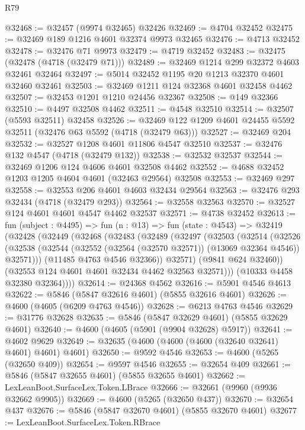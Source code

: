 \begin{lexlean}{R79}
\begin{coremodule}
@32468 := @32457 (@9974 @32465) @32426
@32469 := @4704 @32452
@32475 := @32469 @189 @1216 @4601 @32374 @9973 @32465
@32476 := @4713 @32452
@32478 := @32476 @71 @9973
@32479 := @4719 @32452
@32483 := @32475 (@32478 (@4718 (@32479 @71)))
@32489 := @32469 @1214 @299 @32372 @4603 @32461 @32464
@32497 := @5014 @32452 @1195 @20 @1213 @32370 @4601 @32460 @32461
@32503 := @32469 @1211 @124 @32368 @4601 @32458 @4462
@32507 := @32453 @1201 @1210 @24456 @32367
@32508 := @149 @32366
@32510 := @4497 @32508 @4462
@32511 := @4548 @32510
@32514 := @32507 (@5593 @32511) @32458
@32526 := @32469 @122 @1209 @4601 @24455 @5592 @32511 (@32476 @63 @5592 (@4718 (@32479 @63)))
@32527 := @32469 @204
@32532 := @32527 @1208 @4601 @11806 @4547 @32510
@32537 := @32476 @132 @4547 (@4718 (@32479 @132))
@32538 := @32532 @32537
@32544 := @32469 @1206 @124 @4606 @4601 @32508 @4462
@32552 := @4688 @32452 @1203 @1205 @4604 @4601 (@32463 @29564) @32508
@32553 := @32469 @297
@32558 := @32553 @206 @4601 @4603 @32434 @29564
@32563 := @32476 @293 @32434 (@4718 (@32479 @293))
@32564 := @32558 @32563
@32570 := @32527 @124 @4601 @4601 @4547 @4462 @32537
@32571 := @4738 @32452
@32613 := fun (subject : @4495) =>
  fun (n : @13) =>
  fun (state : @4543) =>
  @32419
    (@32428
      (@32449
        (@32468
          (@32483
            (@32489
              (@32497
                (@32503
                  (@32514
                    (@32526
                      (@32538
                        (@32544 (@32552 (@32564 (@32570 @32571)) (@13069 @32364 @4546)) @32571)))
                    (@11485 @4763 @4546 @32366))
                  @32571)
                (@9841 @624 @32460))
              (@32553 @124 @4601 @4601 @32434 @4462 @32563 @32571)))
          (@10333 @4458 @32380 @32364))))
@32614 := @24368 @4562
@32616 := @5901 @4546 @4613
@32622 := @5846 (@5847 @32616 @4601) (@5855 @32616 @4601)
@32626 := @4600 (@4605 (@6209 @4763 @4546))
@32628 := @6213 @4763 @4546
@32629 := @31776 @32628
@32635 := @5846 (@5847 @32629 @4601) (@5855 @32629 @4601)
@32640 := @4600 (@4605 (@5901 (@9904 @32628) @5917))
@32641 := @4602 @9629
@32649 := @32635 (@4600 (@4600 (@4600 (@32640 @32641) @4601) @4601) @4601)
@32650 := @9592 @4546
@32653 := @4600 (@5265 (@32650 @409))
@32654 := @9597 @4546
@32655 := @32654 @409
@32661 := @5846 (@5847 @32655 @4601) (@5855 @32655 @4601)
@32662 := LexLeanBoot.SurfaceLex.Token.LBrace
@32666 := @32661 (@9960 (@9936 @32662 @9905))
@32669 := @4600 (@5265 (@32650 @437))
@32670 := @32654 @437
@32676 := @5846 (@5847 @32670 @4601) (@5855 @32670 @4601)
@32677 := LexLeanBoot.SurfaceLex.Token.RBrace

\end{coremodule}
\end{lexlean}
